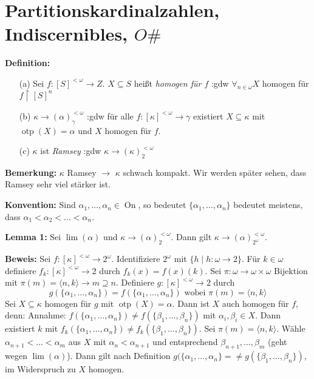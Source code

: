 \documentclass[a4paper,fontsize=11pt]{scrartcl}
\newcommand{\On}{\operatorname{On}}
\newcommand{\otp}{\operatorname{otp}}
\begin{document}
\section{Partitionskardinalzahlen, Indiscernibles, $O\#$}


{\bf Definition:} \begin{enumerate}
    \item[(a)] Sei $f\colon [S]^{<\omega}\to Z$.
      $X\subseteq S$ heißt \emph{homogen für $f$} :gdw $\forall_{n\in\omega} X$ homogen für $f\upharpoonright [S]^n$
    \item[(b)] $\kappa\to(\alpha)^{<\omega}_{\gamma}$ :gdw 
      für alle $f\colon [\kappa]^{<\omega}\to\gamma$ existiert $X\subseteq\kappa$ mit $\otp(X)=\alpha$ und $X$ homogen für $f$.
    \item[(c)] $\kappa$ ist \emph{Ramsey} :gdw $\kappa\to(\kappa)^{<\omega}_2$
  \end{enumerate}

{\bf Bemerkung:} $\kappa$ Ramsey $\to$ $\kappa$ schwach kompakt.
  Wir werden später sehen, dass Ramsey sehr viel stärker ist.

{\bf Konvention:} Sind $\alpha_1,\ldots,\alpha_n\in \On$, so bedeutet  $\{\alpha_1,\ldots,\alpha_n\}$ bedeutet meistens, dass $\alpha_1<\alpha_2<\ldots<\alpha_n$.

{\bf Lemma 1:} Sei $\lim(\alpha)$ und $\kappa\to(\alpha)^{<\omega}_2$.
  Dann gilt $\kappa\to(\alpha)^{<\omega}_{2^{\omega}}$.
  
  {\bf Beweis:} Sei $f\colon [\kappa]^{<\omega}\to 2^{\omega}$.
    Identifiziere $2^{\omega}$ mit $\{h\mid h\colon \omega\to 2\}$.
    Für $k\in \omega$ definiere $f_k\colon [\kappa]^{<\omega}\to 2$ durch $f_k(x)=f(x)(k)$.
    Sei $\pi\colon \omega\to\omega\times\omega$ Bijektion mit $\pi(m)=\langle n,k\rangle\to m\supseteq n$.
    Definiere $g\colon[\kappa]^{<\omega}\to 2$ durch
    $$ g(\{\alpha_1,\ldots,\alpha_n\})=f(\{\alpha_1,\ldots,\alpha_n\}) \mbox{ wobei } \pi(m)=\langle n,k\rangle$$
    Sei $X\subseteq \kappa$ homogen für $g$ mit $\otp(X)=\alpha$.
    Dann ist $X$ auch homogen für $f$, denn:
    Annahme: $f(\{\alpha_1,\ldots,\alpha_n\})\neq f(\{\beta_1,\ldots,\beta_n\})$ mit $\alpha_i,\beta_i\in X$.
    Dann existiert $k$ mit $f_k(\{\alpha_1,\ldots,\alpha_n\})\neq f_k(\{\beta_1,\ldots,\beta_n\})$.
    Sei $\pi(m)=\langle n,k\rangle$.
    Wähle $\alpha_{n+1}<\ldots<\alpha_m$ aus $X$ mit $\alpha_n<\alpha_{n+1}$ und entsprechend $\beta_{n+1},\ldots,\beta_m$ (geht wegen $\lim(\alpha)$).
    Dann gilt nach Definition $g(\{\alpha_1,\ldots,\alpha_n\}=\neq g(\{\beta_1,\ldots,\beta_n\})$, im Widerspruch zu $X$ homogen.
    
\end{document}
